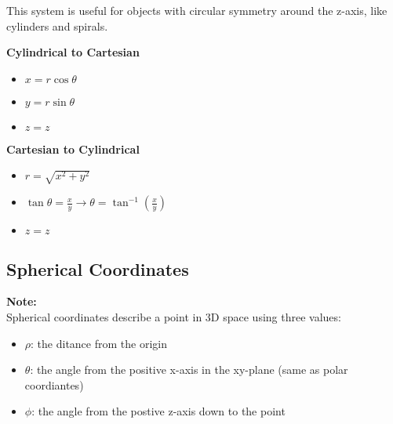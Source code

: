 \documentclass[10pt]{article}                               %
\begin{document}
\begin{tcolorbox}
\begin{adjustwidth}{2em}{0pt}
\begin{adjustwidth}{2em}{0pt}
\begin{tcolorbox}[enhanced, colback=white, colframe=black, boxrule=0.5pt]
                This system is useful for objects with circular symmetry around the z-axis, like cylinders and spirals.

            \end{tcolorbox}

            \vspace{0.5em}

            \textbf{Cylindrical to Cartesian}

            \begin{itemize}
                \item \( x = r\cos\theta \)
                \item \( y = r\sin\theta \)
                \item \( z = z \)
            \end{itemize}

            \vspace{0.5em}

            \textbf{Cartesian to Cylindrical}

            \begin{itemize}
                \item \( r = \sqrt{x^2 + y^2} \)
                \item \( \tan\theta = \frac{x}{y}  \rightarrow  \theta = \tan^{-1}\left(\frac{x}{y}\right) \)
                \item \( z = z \)
            \end{itemize}

        \end{adjustwidth}


        \subsection*{Spherical Coordinates}

        \begin{adjustwidth}{2em}{0pt}

            \begin{tcolorbox}[enhanced, colback=white, colframe=black, boxrule=0.5pt]

                \textbf{Note:} \\
                Spherical coordinates describe a point in 3D space using three values:
                        
                \begin{itemize}
                    \item \( \rho \): the ditance from the origin
                    \item \( \theta \): the angle from the positive x-axis in the xy-plane (same as polar coordiantes)
                    \item \( \phi \): the angle from the postive z-axis down to the point
                \end{itemize}


\end{tcolorbox}
\end{adjustwidth}
\end{adjustwidth}
\end{tcolorbox}
\end{document}
